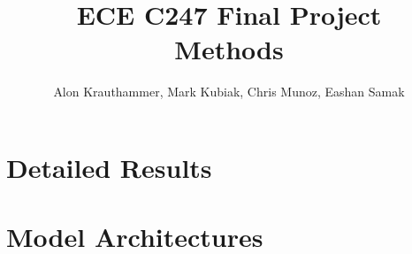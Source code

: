 \documentclass{article}
\author{Alon Krauthammer, Mark Kubiak, Chris Munoz, Eashan Samak}
\title{ECE C247 Final Project\\
Methods}
\begin{document}
\maketitle

\section{Detailed Results}

\section{Model Architectures}
\end{document}
